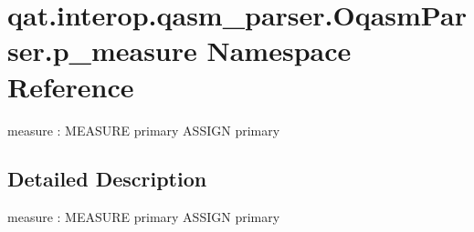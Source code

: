 \hypertarget{namespaceqat_1_1interop_1_1qasm__parser_1_1OqasmParser_1_1p__measure}{\section{qat.\-interop.\-qasm\-\_\-parser.\-Oqasm\-Parser.\-p\-\_\-measure Namespace Reference}
\label{namespaceqat_1_1interop_1_1qasm__parser_1_1OqasmParser_1_1p__measure}
}


measure \-: M\-E\-A\-S\-U\-R\-E primary A\-S\-S\-I\-G\-N primary  




\subsection{Detailed Description}
measure \-: M\-E\-A\-S\-U\-R\-E primary A\-S\-S\-I\-G\-N primary 